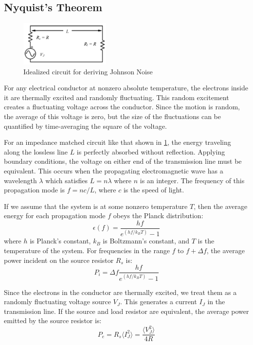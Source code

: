 \documentclass[12pt]{article}
\begin{document}
	\subsection{Nyquist's Theorem}
	\begin{figure}
		\includegraphics[width=0.4\textwidth]{circuit1.png}
		\caption{Idealized circuit for deriving Johnson Noise}
		\label{circuit1}
	\end{figure}
	For any electrical conductor at nonzero absolute temperature, the electrons inside it are thermally excited and randomly fluctuating. This random excitement creates a fluctuating voltage across the conductor. Since the motion is random, the average of this voltage is zero, but the size of the fluctuations can be quantified by time-averaging the square of the voltage. 
		
	For an impedance matched circuit like that shown in \cref{circuit1}, the energy traveling along the lossless line $L$ is perfectly absorbed without reflection. Applying boundary conditions, the voltage on either end of the transmission line must be equivalent. This occurs when the propagating electromagnetic wave has a wavelength $\lambda$ which satisfies $L=n\lambda$ where $n$ is an integer. The frequency of this propagation mode is $f = nc/L$, where $c$ is the speed of light.
	
	If we assume that the system is at some nonzero temperature $T$, then the average energy for each propagation mode $f$ obeys the Planck distribution:
	\begin{equation}
		\epsilon (f) = \frac{hf}{e^{(hf/k_BT)}-1}
	\end{equation}
	where $h$ is Planck's constant, $k_B$ is Boltzmann's constant, and $T$ is the temperature of the system. For frequencies in the range $f$ to $f+\Delta f$, the average power incident on the source resistor $R_s$ is:
	\begin{equation}
		P_i = \Delta f \frac{hf}{e^{(hf/k_BT)}-1}
	\end{equation}
	
	Since the electrons in the conductor are thermally excited, we treat them as a randomly fluctuating voltage source $V_J$. This generates a current $I_J$ in the transmission line. If the source and load resistor are equivalent, the average power emitted by the source resistor is:
	\begin{equation}
		P_e = R_s \langle I_J^2 \rangle = \frac{\langle V_J^2\rangle}{4R}
	\end{equation}
	
\end{document}
